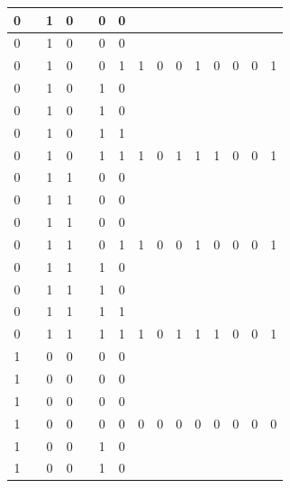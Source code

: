 \begin{table}[!tb]
\begin{tabular}{|c|c|c|c|c|c|c|c|c|c|c|c|c|c|c|}
        \rowcolor{yellow!40} 0 &  & 1 & 0 &  & 0 & 0 &  &  &  &  &  &  &  &  \\ \hline
        \rowcolor{yellow!40} 0 &  & 1 & 0 &  & 0 & 0 &  &  &  &  &  &  &  &  \\ \hline
        \rowcolor{yellow!40} 0 &  & 1 & 0 &  & 0 & 1 & 1 & 0 & 0 & 1 & 0 & 0 & 0 & 1 \\ \hline
        \rowcolor{gray!40} 0 &  & 1 & 0 &  & 1 & 0 &  &  &  &  &  &  &  &  \\ \hline
        \rowcolor{gray!40} 0 &  & 1 & 0 &  & 1 & 0 &  &  &  &  &  &  &  &  \\ \hline
        \rowcolor{gray!40} 0 &  & 1 & 0 &  & 1 & 1 &  &  &  &  &  &  &  &  \\ \hline
        \rowcolor{gray!40} 0 &  & 1 & 0 &  & 1 & 1 & 1 & 0 & 1 & 1 & 1 & 0 & 0 & 1 \\ \hline
        \rowcolor{blue!40} 0 &  & 1 & 1 &  & 0 & 0 &  &  &  &  &  &  &  &  \\ \hline
        \rowcolor{blue!40} 0 &  & 1 & 1 &  & 0 & 0 &  &  &  &  &  &  &  &  \\ \hline
        \rowcolor{blue!40} 0 &  & 1 & 1 &  & 0 & 0 &  &  &  &  &  &  &  &  \\ \hline
        \rowcolor{blue!40} 0 &  & 1 & 1 &  & 0 & 1 & 1 & 0 & 0 & 1 & 0 & 0 & 0 & 1 \\ \hline
        \rowcolor{red!40} 0 &  & 1 & 1 &  & 1 & 0 &  &  &  &  &  &  &  &  \\ \hline
        \rowcolor{red!40} 0 &  & 1 & 1 &  & 1 & 0 &  &  &  &  &  &  &  &  \\ \hline
        \rowcolor{red!40} 0 &  & 1 & 1 &  & 1 & 1 &  &  &  &  &  &  &  &  \\ \hline
        \rowcolor{red!40} 0 &  & 1 & 1 &  & 1 & 1 & 1 & 0 & 1 & 1 & 1 & 0 & 0 & 1 \\ \hline
        \rowcolor{green!40} 1 &  & 0 & 0 &  & 0 & 0 &  &  &  &  &  &  &  &  \\ \hline
        \rowcolor{green!40} 1 &  & 0 & 0 &  & 0 & 0 &  &  &  &  &  &  &  &  \\ \hline
        \rowcolor{green!40} 1 &  & 0 & 0 &  & 0 & 0 &  &  &  &  &  &  &  &  \\ \hline
        \rowcolor{green!40} 1 &  & 0 & 0 &  & 0 & 0 & 0 & 0 & 0 & 0 & 0 & 0 & 0 & 0 \\ \hline
        \rowcolor{yellow!40} 1 &  & 0 & 0 &  & 1 & 0 &  &  &  &  &  &  &  &  \\ \hline
        \rowcolor{yellow!40} 1 &  & 0 & 0 &  & 1 & 0 &  &  &  &  &  &  &  &  \\ \hline

\end{tabular}
\end{table}
